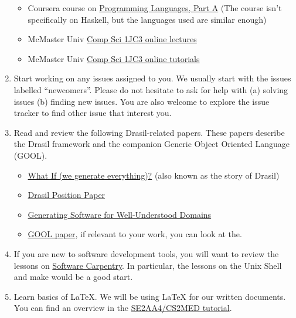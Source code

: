\documentclass[12pt]{article}
\begin{document}
\begin{enumerate}
\begin{itemize}
\item Coursera course on
\href{https://www.coursera.org/learn/programming-languages} {Programming
Languages, Part A} (The course isn't specifically on Haskell, but the languages
used are similar enough)

\item McMaster Univ
\href{https://www.youtube.com/watch?v=eGwR_MiIT_A&list=PLknslYp7IpnJYHyJd02cOsp0ZBKxWBXK9}
{Comp Sci 1JC3 online lectures} 

\item McMaster Univ
\href{https://www.youtube.com/watch?v=7WxbuAztuFs&list=PLHRF-X-NtQR4MZBvm05NshPIEI8ELID5m}
{Comp Sci 1JC3 online tutorials} 

\end{itemize}

\item Start working on any issues assigned to you.  We usually start with the
issues labelled ``newcomers''.  Please do not hesitate to ask for help with (a)
solving issues (b) finding new issues.  You are also welcome to explore the
issue tracker to find other issue that interest you.

\item Read and review the following Drasil-related papers.  These papers
describe the Drasil framework and the companion Generic Object Oriented Language
(GOOL).

\begin{itemize}

\item \href{https://github.com/JacquesCarette/Drasil/wiki/What-If} {What If (we
generate everything)?} (also known as the story of Drasil)

\item
\href{https://gitlab.cas.mcmaster.ca/smiths/pub/-/blob/master/SzymczakEtAl2016.pdf}
{Drasil Position Paper} 

\item \href{https://arxiv.org/abs/2302.00740} {Generating Software for
Well-Understood Domains}

\item \href{https://arxiv.org/abs/1911.11824} {GOOL paper}, if relevant to
your work, you can look at the.

\end{itemize}

\item If you are new to software development tools, you will want to review the
lessons on \href{http://software-carpentry.org/lessons/} {Software Carpentry}.
In particular, the lessons on the Unix Shell and make would be a good start.

\item Learn basics of LaTeX.  We will be using LaTeX for our written documents.
You can find an overview in the
\href{https://gitlab.cas.mcmaster.ca/smiths/se2aa4_cs2me3/-/tree/master/Tutorials\%2FT02a-LaTeX}
{SE2AA4/CS2MED tutorial}.

\end{enumerate}
\end{document}

